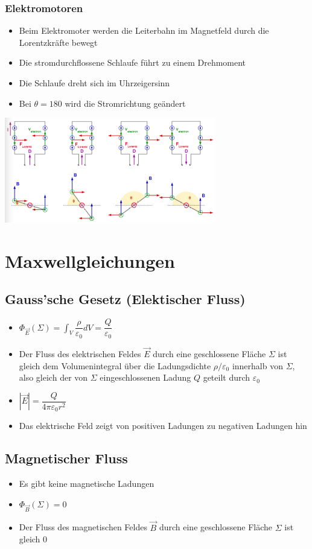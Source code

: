 \documentclass[8pt,a4paper]{scrartcl}
\begin{document}
\begin{multicols*}{3}
					\subsubsection{Elektromotoren}
						\begin{itemize}\itemsep0pt
							\item Beim Elektromoter werden die Leiterbahn im Magnetfeld durch die Lorentzkräfte bewegt
							\item Die stromdurchflossene Schlaufe führt zu einem Drehmoment
							\item Die Schlaufe dreht sich im Uhrzeigersinn
							\item Bei $\theta = 180$ wird die Stromrichtung geändert
						\end{itemize}		
						\includegraphics[height=4.6cm]{img/elemot.png} 
			\section{Maxwellgleichungen}
				\subsection{Gauss’sche Gesetz (Elektischer Fluss)}
					\begin{itemize}\itemsep0pt
						\item $\Phi_{\overrightarrow{E}}(\Sigma) = \int_{V}\dfrac{\rho}{\varepsilon_{0}}dV = \dfrac{Q}{\varepsilon_{0}}$
						\item Der Fluss des elektrischen Feldes $\overrightarrow{E}$ durch eine geschlossene Fläche $\Sigma$ ist gleich dem Volumenintegral über die Ladungsdichte $\rho / \varepsilon_{0}$ innerhalb von $\Sigma$, also gleich der von $\Sigma$ eingeschlossenen Ladung $Q$ geteilt durch $\varepsilon_{0}$
						\item $|\overrightarrow{E}| = \dfrac{Q}{4\pi\varepsilon_{0}r^{2}}$
						\item Das elektrische Feld zeigt von positiven Ladungen zu negativen Ladungen hin
					\end{itemize}		
				\subsection{Magnetischer Fluss}
					\begin{itemize}\itemsep0pt
						\item Es gibt keine magnetische Ladungen
						\item $\Phi_{\overrightarrow{B}}(\Sigma) =0$
						\item Der Fluss des magnetischen Feldes $\overrightarrow{B}$ durch eine geschlossene Fläche $\Sigma$ ist gleich 0
					\end{itemize}	

\end{multicols*}
\end{document}
